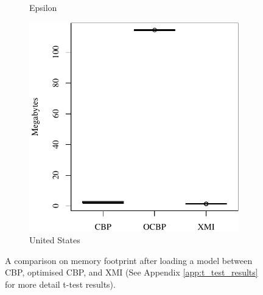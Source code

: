\documentclass{llncs}
\begin{document}
\begin{figure}[t]
\begin{subfigure}{0.325\textwidth}
            \caption{Epsilon}
            \label{fig:load_memory_epsilon}
        \end{subfigure}
        \hfill
        \begin{subfigure}{0.325\textwidth}
            \centering
            \includegraphics[width=\linewidth]{images/load_memory_wikipedia}
            \caption{United States}
            \label{fig:load_memory_wikipedia}
        \end{subfigure}
        \caption{A comparison on memory footprint after loading a model between CBP, optimised CBP, and XMI (See Appendix \ref{app:t_test_results} for more detail t-test results).}
        \label{fig:loadmemory}
    \end{figure}
    
\end{document}
